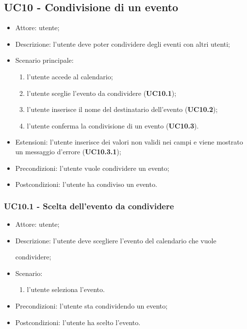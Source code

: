 \subsection{UC10 - Condivisione di un evento}
\begin{itemize}
    \item Attore: utente;
    \item Descrizione: l'utente deve poter condividere degli eventi con altri utenti;
    \item Scenario principale:
        \begin{enumerate}
        \item l'utente accede al calendario;
        \item l'utente sceglie l'evento da condividere (\textbf{UC10.1});
        \item l'utente inserisce il nome del destinatario dell'evento (\textbf{UC10.2});
        \item l'utente conferma la condivisione di un evento (\textbf{UC10.3}).
        \end{enumerate}
    \item Estensioni: l'utente inserisce dei valori non validi nei campi e viene mostrato un messaggio d'errore (\textbf{UC10.3.1});
    \item Precondizioni: l'utente vuole condividere un evento;
    \item Postcondizioni: l'utente ha condiviso un evento.
\end{itemize}

\subsubsection{UC10.1 - Scelta dell'evento da condividere}
\begin{itemize}
    \item Attore: utente;
    \item Descrizione: l'utente deve scegliere l'evento del calendario che vuole \par condividere;
    \item Scenario:
        \begin{enumerate}
        \item l'utente seleziona l'evento.
        \end{enumerate}
    
    \item Precondizioni: l'utente sta condividendo un evento;
    \item Postcondizioni: l'utente ha scelto l'evento.
\end{itemize}


